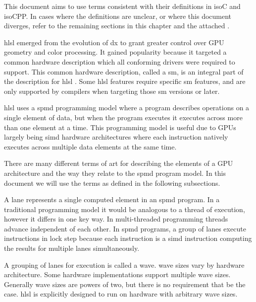 
\p This document aims to use terms consistent with their definitions in
\gls{isoC} and \gls{isoCPP}. In cases where the definitions are unclear, or
where this document diverges, refer to the remaining sections in this
chapter and the attached .


\p \acrshort{hlsl} emerged from the evolution of \gls{dx} to grant greater
control over GPU geometry and color processing. It gained popularity because it
targeted a common hardware description which all conforming drivers were
required to support. This common hardware description, called a \gls{sm}, is an
integral part of the description for \acrshort{hlsl} . Some \acrshort{hlsl}
features require specific \gls{sm} features, and are only supported by compilers
when targeting those \gls{sm} versions or later.


\p \acrshort{hlsl} uses a \acrfull{spmd} programming model where a program
describes operations on a single element of data, but when the program executes
it executes across more than one element at a time. This programming model is
useful due to GPUs largely being \acrfull{simd} hardware architectures where
each instruction natively executes across multiple data elements at the same
time.

\p There are many different terms of art for describing the elements of a GPU
architecture and the way they relate to the \acrshort{spmd} program model. In
this document we will use the terms as defined in the following subsections.


\p A \gls{lane} represents a single computed element in an \acrshort{spmd}
program. In a traditional programming model it would be analogous to a thread of
execution, however it differs in one key way. In multi-threaded programming
threads advance independent of each other. In \acrshort{spmd} programs, a group
of \gls{lane}s execute instructions in lock step because each instruction is a
\acrshort{simd} instruction computing the results for multiple \gls{lane}s
simultaneously.


\p A grouping of \gls{lane}s for execution is called a \gls{wave}. \gls{wave}
sizes vary by hardware architecture. Some hardware implementations support
multiple wave sizes. Generally wave sizes are powers of two, but there is no
requirement that be the case. \acrshort{hlsl} is explicitly designed to run on
hardware with arbitrary \gls{wave} sizes.

